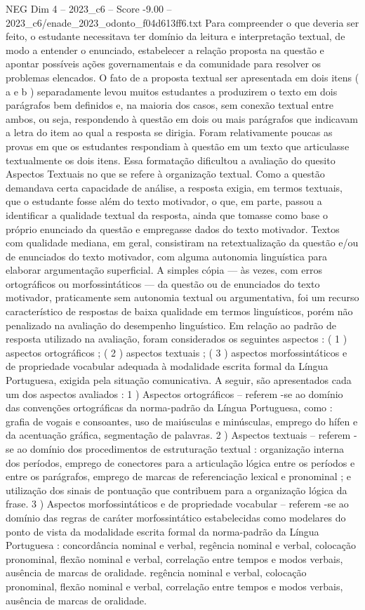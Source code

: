 \begin{textsample}{NEG Dim 4 – 2023\_c6 – Score -9.00 – 2023\_c6/enade\_2023\_odonto\_f04d613ff6.txt}
Para compreender o que deveria ser feito, o estudante necessitava ter domínio da leitura e interpretação textual, de modo a entender o enunciado, estabelecer a relação proposta na questão e apontar possíveis ações governamentais e da comunidade para resolver os problemas elencados.
O fato de a proposta textual ser apresentada em dois itens ( a e b ) separadamente levou muitos estudantes a produzirem o texto em dois parágrafos bem definidos e, na maioria dos casos, sem conexão textual entre ambos, ou seja, respondendo à questão em dois ou mais parágrafos que indicavam a letra do item ao qual a resposta se dirigia.
Foram relativamente poucas as provas em que os estudantes respondiam à questão em um texto que articulasse textualmente os dois itens.
Essa formatação dificultou a avaliação do quesito Aspectos Textuais no que se refere à organização textual.
Como a questão demandava certa capacidade de análise, a resposta exigia, em termos textuais, que o estudante fosse além do texto motivador, o que, em parte, passou a identificar a qualidade textual da resposta, ainda que tomasse como base o próprio enunciado da questão e empregasse dados do texto motivador.
Textos com qualidade mediana, em geral, consistiram na retextualização da questão e/ou de enunciados do texto motivador, com alguma autonomia linguística para elaborar argumentação superficial.
A simples cópia — às vezes, com erros ortográficos ou morfossintáticos — da questão ou de enunciados do texto motivador, praticamente sem autonomia textual ou argumentativa, foi um recurso característico de respostas de baixa qualidade em termos linguísticos, porém não penalizado na avaliação do desempenho linguístico.
Em relação ao padrão de resposta utilizado na avaliação, foram considerados os seguintes aspectos : ( 1 ) aspectos ortográficos ; ( 2 ) aspectos textuais ; ( 3 ) aspectos morfossintáticos e de propriedade vocabular adequada à modalidade escrita formal da Língua Portuguesa, exigida pela situação comunicativa.
A seguir, são apresentados cada um dos aspectos avaliados : 1 ) Aspectos ortográficos – referem -se ao domínio das convenções ortográficas da norma-padrão da Língua Portuguesa, como : grafia de vogais e consoantes, uso de maiúsculas e minúsculas, emprego do hífen e da acentuação gráfica, segmentação de palavras. 2 ) Aspectos textuais – referem -se ao domínio dos procedimentos de estruturação textual : organização interna dos períodos, emprego de conectores para a articulação lógica entre os períodos e entre os parágrafos, emprego de marcas de referenciação lexical e pronominal ; e utilização dos sinais de pontuação que contribuem para a organização lógica da frase. 3 ) Aspectos morfossintáticos e de propriedade vocabular – referem -se ao domínio das regras de caráter morfossintático estabelecidas como modelares do ponto de vista da modalidade escrita formal da norma-padrão da Língua Portuguesa : concordância nominal e verbal, regência nominal e verbal, colocação pronominal, flexão nominal e verbal, correlação entre tempos e modos verbais, ausência de marcas de oralidade. regência nominal e verbal, colocação pronominal, flexão nominal e verbal, correlação entre tempos e modos verbais, ausência de marcas de oralidade.

\end{textsample}
